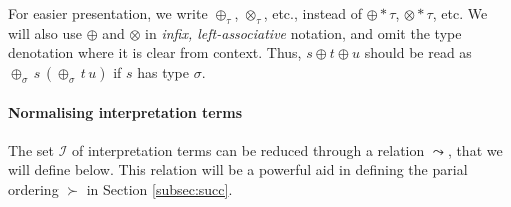 \documentclass[a4paper,UKenglish,cleveref,autoref,numberwithinsect]{lipics-v2019}
\theoremstyle{definition}
\newcommand{\Iterms}{\mathcal{I}}
\newcommand{\tapp}[2]{#1 * #2}
\newcommand{\arrW}{\leadsto}
\begin{document}
For easier presentation, we write $\oplus_\tau$, $\otimes_\tau$, etc.,
instead of $\tapp{\oplus}{\tau}$, $\tapp{\otimes}{\tau}$, etc. We will
also use $\oplus$ and $\otimes$ in \emph{infix, left-associative}
notation, and omit the type denotation where it is clear from
context. Thus, $s \oplus t \oplus u$ should be read as
\pagebreak
$\oplus_\sigma\,s\,(\oplus_\sigma\,t\,u)$ if $s$ has type $\sigma$.

\paragraph*{Normalising interpretation terms}

The set $\Iterms$ of interpretation terms can be reduced through
a relation $\arrW$, that we will define below.  This relation will
be a powerful aid in defining the parial ordering $\succ$ in Section
\ref{subsec:succ}.
\end{document}
